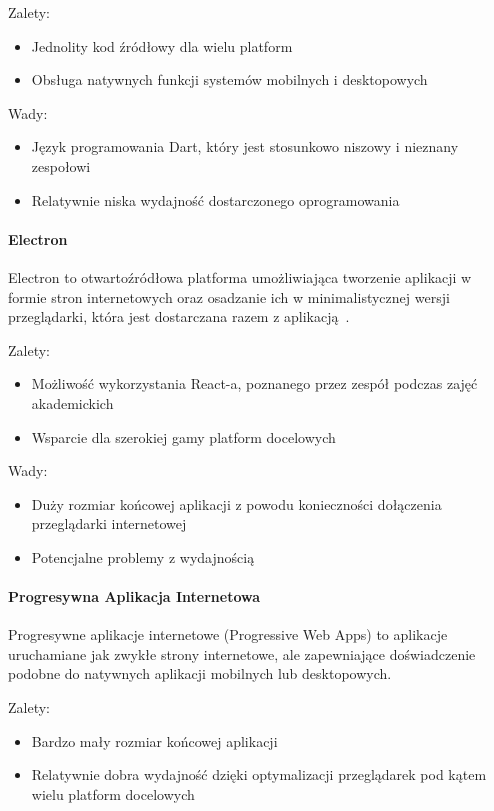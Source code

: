 Zalety:
\begin{itemize}
    \item Jednolity kod źródłowy dla wielu platform
    \item Obsługa natywnych funkcji systemów mobilnych i desktopowych
\end{itemize}

Wady:
\begin{itemize}
    \item Język programowania Dart, który jest stosunkowo niszowy i nieznany zespołowi
    \item Relatywnie niska wydajność dostarczonego oprogramowania\cite{flutter-perf}
\end{itemize}

\paragraph{Electron}
Electron to otwartoźródłowa platforma umożliwiająca tworzenie aplikacji w formie stron internetowych oraz osadzanie ich w minimalistycznej wersji przeglądarki, która jest dostarczana razem z aplikacją~\cite{electron-in-action}.

Zalety:
\begin{itemize}
    \item Możliwość wykorzystania React-a, poznanego przez zespół podczas zajęć akademickich
    \item Wsparcie dla szerokiej gamy platform docelowych
\end{itemize}

Wady:
\begin{itemize}
    \item Duży rozmiar końcowej aplikacji z powodu konieczności dołączenia przeglądarki internetowej
    \item Potencjalne problemy z wydajnością
\end{itemize}

\paragraph{Progresywna Aplikacja Internetowa}
Progresywne aplikacje internetowe (Progressive Web Apps) to aplikacje uruchamiane jak zwykłe strony internetowe, ale zapewniające doświadczenie podobne do natywnych aplikacji mobilnych lub desktopowych.\cite{pwa-book}

Zalety:
\begin{itemize}
    \item Bardzo mały rozmiar końcowej aplikacji
    \item Relatywnie dobra wydajność dzięki optymalizacji przeglądarek pod kątem wielu platform docelowych
\end{itemize}

